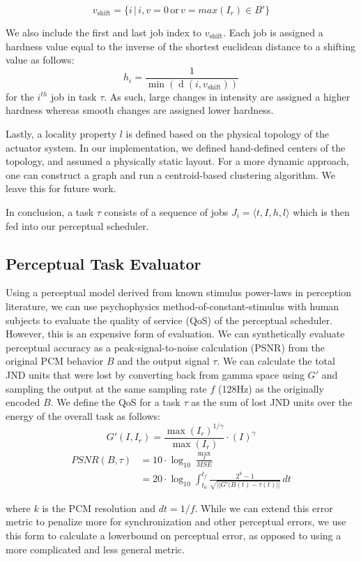 \documentclass{sigchi}
\DeclareMathOperator{\dis}{d}
\begin{document}
    $$v_\text{shift} = \{ i \,\vert \,i, v = 0 \,\text{or} \, v = max(I_r) \in B'\}$$ 

    We also include the first and last job index to $v_\text{shift}$. Each job is assigned a hardness value equal to the inverse of the shortest euclidean distance to a shifting value as follows:
    $$ h_{i} = \frac{1}{\min (\dis(i, v_\text{shift} ))}$$ 
    for the $i^{th}$ job in task $\tau$. As such, large changes in intensity are assigned a higher hardness whereas smooth changes are assigned lower hardness. 

    Lastly, a locality property $l$ is defined based on the physical topology of the actuator system. In our implementation, we defined hand-defined centers of the topology, and assumed a physically static layout. For a more dynamic approach, one can construct a graph and run a centroid-based clustering algorithm. We leave this for future work.  
  
  In conclusion, a task $\tau$ consists of a sequence of jobs $J_i = \langle t, I, h, l \rangle$ which is then fed into our perceptual scheduler. 

  \subsection{Perceptual Task Evaluator}
  Using a perceptual model derived from known stimulus power-laws in perception literature, we can use psychophysics method-of-constant-stimulus with human subjects to evaluate the quality of service (QoS) of the perceptual scheduler. However, this is an expensive form of evaluation. 
  We can synthetically evaluate perceptual accuracy as a peak-signal-to-noise calculation (PSNR) from the original PCM behavior $B$ and the output signal $\tau$. We can calculate the total JND units that were lost by converting back from gamma space using $G'$ and sampling the output at the same sampling rate $f$ (128Hz) as the originally encoded $B$. We define the QoS for a task $\tau$ as the sum of lost JND units over the energy of the overall task as follows:
  $$G'(I, I_r) = \frac{\max(I_r)^{1/\gamma}}{\max(I_r)} \cdot (I)^\gamma $$
  \begin{align}
  PSNR(B, \tau) &= 10 \cdot \log_{10} \frac{\max_I}{MSE}\\
  &= 20 \cdot \log_{10} \int_{t_0}^{t_f} \frac{2^k-1}{\sqrt{\lvert\lvert G'(B(t) - \tau(t) \rvert\rvert}}  \, dt
  \label{eq:error}
  \end{align}


  where $k$ is the PCM resolution and $dt = 1/f$. While we can extend this error metric to penalize more for synchronization and other perceptual errors, we use this form to calculate a lowerbound on perceptual error, as opposed to using a more complicated and less general metric. 
\end{document}
